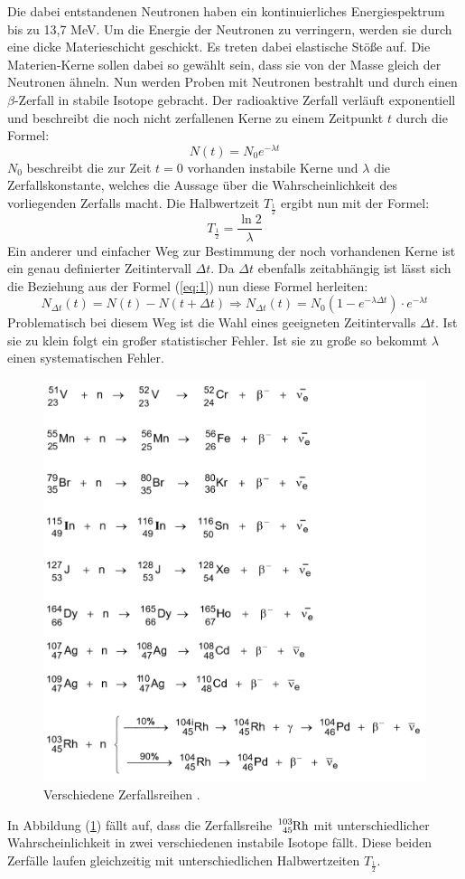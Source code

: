 Die dabei entstandenen Neutronen haben ein kontinuierliches Energiespektrum bis zu 13,7 MeV. Um die Energie der Neutronen zu verringern, werden sie durch eine
dicke Materieschicht geschickt. Es treten dabei elastische Stöße auf. Die
Materien-Kerne sollen dabei so gewählt sein, dass sie von der Masse gleich der Neutronen ähneln.
Nun werden Proben mit Neutronen bestrahlt und durch einen $\beta$-Zerfall in stabile Isotope gebracht.
Der radioaktive Zerfall verläuft exponentiell und beschreibt die noch nicht zerfallenen Kerne zu einem Zeitpunkt $t$ durch die Formel:
\begin{equation}
  N(t)= N_0 e^{-\lambda t}
  \label{eq:1}
\end{equation}
$N_0$ beschreibt die zur Zeit $t = 0$ vorhanden instabile Kerne und $\lambda$ die Zerfallskonstante, welches die Aussage über die Wahrscheinlichkeit
des vorliegenden Zerfalls macht.
Die Halbwertzeit $T_{\frac{1}{2}}$ ergibt nun mit der Formel:
\begin{equation}
  T_{\frac{1}{2}} = \frac{\ln 2}{\lambda}
  \label{eq:2}
\end{equation}
Ein anderer und einfacher Weg zur Bestimmung der noch vorhandenen Kerne ist
ein genau definierter Zeitintervall $\Delta t$.
Da $\Delta t$ ebenfalls zeitabhängig ist lässt sich die Beziehung aus der Formel (\ref{eq:1})
nun diese Formel herleiten:
\begin{equation}
  N_{\Delta t} (t) = N(t) - N(t+\Delta t) \Rightarrow N_{\Delta t} (t) =N_0 (1-e^{-\lambda \Delta t}) \cdot e^{-\lambda t}
  \label{eq:3}
\end{equation}
Problematisch bei diesem Weg ist die Wahl eines geeigneten Zeitintervalls $\Delta t$. Ist sie zu klein folgt ein großer statistischer Fehler.
Ist sie zu große so bekommt $\lambda$ einen systematischen Fehler.
\begin{figure}
  \includegraphics[width=10 cm, height= 5 cm]{content/Verlauf.jpg}
  \caption{Verschiedene Zerfallsreihen \cite{1}.}
  \label{abb:1}
\end{figure}
In Abbildung (\ref{abb:1}) fällt auf, dass die Zerfallsreihe $\ce{^{103}_{45}Rh}$ mit unterschiedlicher Wahrscheinlichkeit
in zwei verschiedenen instabile Isotope fällt.
Diese beiden Zerfälle laufen gleichzeitig mit unterschiedlichen Halbwertzeiten $T_{\frac{1}{2}}$.
